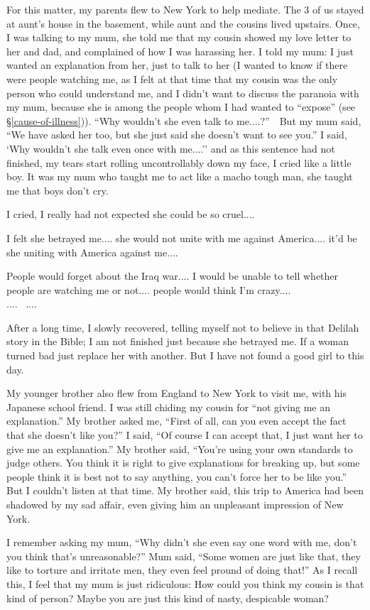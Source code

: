 \documentclass[12pt]{report}
\begin{document}
{
For this matter, my parents flew to New York to help mediate.  The 3 of us stayed at aunt's house in the basement, while aunt and the cousins lived upstairs.  Once, I was talking to my mum, she told me that my cousin showed my love letter to her and dad, and complained of how I was harassing her.  I told my mum:  I just wanted an explanation from her, just to talk to her (I wanted to know if there were people watching me, as I felt at that time that my cousin was the only person who could understand me, and I didn't want to discuss the paranoia with my mum, because she is among the people whom I had wanted to ``expose'' (see \S\ref{cause-of-illness})).  ``Why wouldn't she even talk to me....?'' \,\, But my mum said, ``We have asked her too, but she just said she doesn't want to see you.''  I said, `Why wouldn't she talk even once with me....'' and as this sentence had not finished, my tears start rolling uncontrollably down my face, I cried like a little boy.  It was my mum who taught me to act like a macho tough man, she taught me that boys don't cry.

I cried, I really had not expected she could be so cruel....

I felt she betrayed me....  she would not unite with me against America.... it'd be she uniting with America against me....

People would forget about the Iraq war....  I would be unable to tell whether people are watching me or not....  people would think I'm crazy....\\
.... \, ....

After a long time, I slowly recovered, telling myself not to believe in that Delilah story in the Bible;  I am not finished just because she betrayed me.  If a woman turned bad just replace her with another.  But I have not found a good girl to this day.

My younger brother also flew from England to New York to visit me, with his Japanese school friend.  I was still chiding my cousin for ``not giving me an explanation.''  My brother asked me, ``First of all, can you even accept the fact that she doesn't like you?''  I said, ``Of course I can accept that, I just want her to give me an explanation.''  My brother said, ``You're using your own standards to judge others.  You think it is right to give explanations for breaking up, but some people think it is best not to say anything, you can't force her to be like you.''  But I couldn't listen at that time.  My brother said, this trip to America had been shadowed by my sad affair, even giving him an unpleasant impression of New York.

I remember asking my mum, ``Why didn't she even say one word with me, don't you think that's unreasonable?''  Mum said, ``Some women are just like that, they like to torture and irritate men, they even feel pround of doing that!''  As I recall this, I feel that my mum is just ridiculous:  How could you think my cousin is that kind of person?  Maybe you are just this kind of nasty, despicable woman?
}
\end{document}
